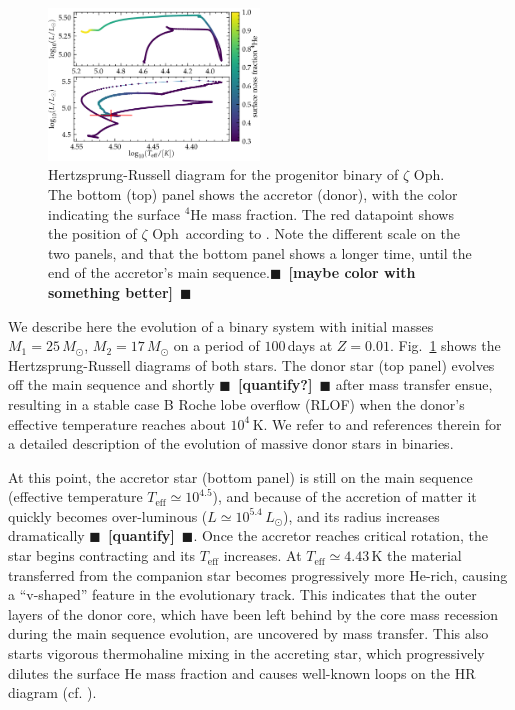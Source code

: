 \documentclass[twocolumn,twocolappendix,trackchanges]{aastex63}
\DeclareRobustCommand{\Figref}[1]{Fig.~\ref{#1}}
\newcommand{\zoph}{$\zeta$ Oph}
\newcommand{\todo}[1]{{\large $\blacksquare$~\textbf{\color{red}[#1]}}~$\blacksquare$}
\begin{document}
\begin{figure}[htbp]
  \includegraphics[width=0.5\textwidth]{HRD_both}
  \caption{Hertzsprung-Russell diagram for the progenitor binary of
    \zoph. The bottom (top) panel shows the accretor (donor), with the
    color indicating the surface $^4\mathrm{He}$ mass fraction. The
    red datapoint shows the position of \zoph\ according to
    \cite{villamariz:05}. Note the different scale on the two panels,
    and that the bottom panel shows a longer time, until the end of
    the accretor's main sequence.\todo{maybe color with something better}}
  \label{fig:HRD_both}
\end{figure}


We describe here the evolution of a binary system with initial masses
$M_1=25\,M_\odot$, $M_2=17\,M_\odot$ on a period of $100$\,days at
$Z=0.01$. \Figref{fig:HRD_both} shows the Hertzsprung-Russell diagrams
of both stars. The donor star (top panel) evolves off the main
sequence and shortly \todo{quantify?} after mass transfer ensue, resulting in a stable
case B \citep{kippenhahn:67} Roche lobe overflow (RLOF) when the
donor's effective temperature reaches about $10^4$\,K. We refer to
\cite{gotberg:17, laplace:21} and references therein for a detailed
description of the evolution of massive donor stars in binaries.

At this point, the accretor star (bottom panel) is still on the main sequence
(effective temperature $T_\mathrm{eff}\simeq10^{4.5}$\K), and because of the accretion of
matter it quickly becomes over-luminous ($L\simeq10^{5.4}\,L_\odot$),
and its radius increases dramatically \todo{quantify}. Once the
accretor reaches critical rotation, the star begins contracting and
its $T_\mathrm{eff}$ increases. At $T_\mathrm{eff}\simeq 4.{43}$\,K
the material transferred from the companion star becomes progressively
more He-rich, causing a ``v-shaped'' feature in the evolutionary
track. This indicates that the outer layers of the donor core, which
have been left behind by the core mass recession during the main
sequence evolution, are uncovered by mass transfer. This also starts
vigorous thermohaline mixing in the accreting star, which
progressively dilutes the surface He mass fraction and causes
well-known loops on the HR diagram (cf. \citealt{cantiello:07}).
\end{document}
